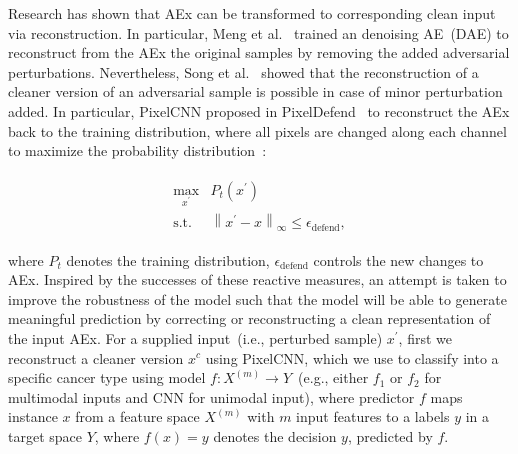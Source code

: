 \hspace*{3.5mm} Research has shown that AEx can be transformed to corresponding clean input via reconstruction. In particular, Meng et al.~\cite{meng2017magnet} trained an denoising AE~(DAE) to reconstruct from the AEx the original samples by  removing the added adversarial perturbations. 
Nevertheless, Song et al.~\cite{song2017pixeldefend} showed that the reconstruction of a cleaner version of an adversarial sample is possible in case of minor perturbation added. In particular, PixelCNN proposed in PixelDefend~\cite{song2017pixeldefend} to reconstruct the AEx back to the training distribution, where all pixels are changed along each channel to maximize the probability distribution~\cite{song2017pixeldefend}:

\vspace{-6mm}
\begin{align}
    \begin{array}{cl}
        \max _{x^{\prime}} & {P}_{t}\left(x^{\prime}\right) \\
        \text {s.t.} & \left\|x^{\prime}-x\right\|_{\infty} \leq \epsilon_{\text {defend}},
    \end{array}
\end{align}

\hspace*{3.5mm} where ${P}_{t}$ denotes the training distribution, $\epsilon_{\text {defend}}$ controls the new changes to AEx. Inspired by the successes of these reactive measures, an attempt is taken to improve the robustness of the model such that the model will be able to generate meaningful prediction by correcting or reconstructing a clean representation of the input AEx. For a supplied input~(i.e., perturbed sample) $x^{\prime}$, first we reconstruct a cleaner version $x^c$ using PixelCNN, which we use to classify into a specific cancer type using model $f: {X}^{(m)} \rightarrow {Y}$~(e.g., either $f_1$ or $f_2$ for multimodal inputs and CNN for unimodal input), where predictor $f$ maps instance $x$ from a feature space ${X}^{(m)}$ with $m$ input features to a labels $y$ in a target space ${Y}$, where $f(x)=y$ denotes the decision $y$, predicted by $f$. %

